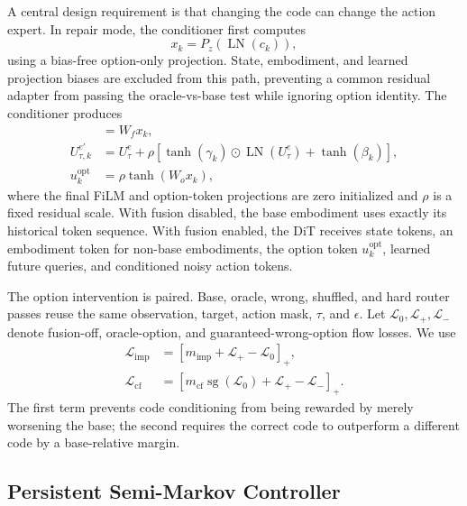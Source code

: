 A central design requirement is that changing the code can change the action
expert.  In repair mode, the conditioner first computes
\begin{equation}
    x_k=P_z(\operatorname{LN}(c_k)),
    \label{eq:option-projection}
\end{equation}
using a bias-free option-only projection.  State, embodiment, and learned
projection biases are excluded from this path, preventing a common residual
adapter from passing the oracle-vs-base test while ignoring option identity.
The conditioner produces
\begin{align}
    [\gamma_k;\beta_k]&=W_f x_k,\\
    U_{\tau,k}^{e\prime}
      &=U_\tau^e+\rho\left[
      \tanh(\gamma_k)\odot\operatorname{LN}(U_\tau^e)
      +\tanh(\beta_k)\right],\\
    u_k^{\mathrm{opt}}&=\rho\tanh(W_o x_k),
    \label{eq:option-conditioner}
\end{align}
where the final FiLM and option-token projections are zero initialized and
\(\rho\) is a fixed residual scale.  With fusion disabled, the base embodiment
uses exactly its historical token sequence.  With fusion enabled, the DiT
receives state tokens, an embodiment token for non-base embodiments, the option
token \(u_k^{\mathrm{opt}}\), learned future queries, and conditioned noisy
action tokens.



The option intervention is paired.  Base, oracle, wrong, shuffled, and hard
router passes reuse the same observation, target, action mask, \(\tau\), and
\(\epsilon\).  Let
\(\mathcal{L}_{0},\mathcal{L}_{+},\mathcal{L}_{-}\) denote fusion-off,
oracle-option, and guaranteed-wrong-option flow losses.  We use
\begin{align}
    \mathcal{L}_{\mathrm{imp}}
      &=\left[m_{\mathrm{imp}}
         +\mathcal{L}_{+}-\mathcal{L}_{0}\right]_+,\\
    \mathcal{L}_{\mathrm{cf}}
      &=\left[m_{\mathrm{cf}}\operatorname{sg}(\mathcal{L}_{0})
         +\mathcal{L}_{+}-\mathcal{L}_{-}\right]_+ .
    \label{eq:paired-losses}
\end{align}
The first term prevents code conditioning from being rewarded by merely
worsening the base; the second requires the correct code to outperform a
different code by a base-relative margin.

\subsection{Persistent Semi-Markov Controller}

